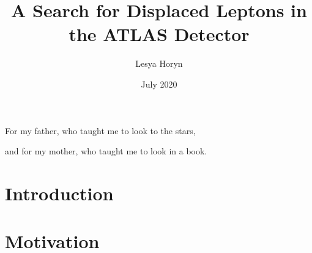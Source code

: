 \documentclass{ucetd}
\title{A Search for Displaced Leptons in the ATLAS Detector}
\author{Lesya Horyn}
\date{July 2020}
\begin{document}
\maketitle

\makecopyright

\clearpage
\begin{center}
    \thispagestyle{empty}
    \vspace*{\fill}
    For my father, who taught me to look to the stars, 

    and for my mother, who taught me to look in a book.
    \vspace*{\fill}
\end{center}
\clearpage




\tableofcontents
\listoffigures
\listoftables



\acknowledgments

\abstract

\mainmatter



\part{Introduction}


\cleardoublepage

\part{Motivation}



\cleardoublepage 

\end{document}
